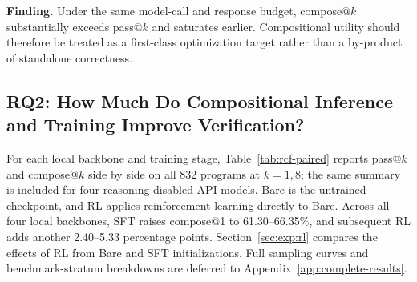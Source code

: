 \begin{insightbox}
\textbf{Finding.}
Under the same model-call and response budget, compose@\(k\) substantially
exceeds pass@\(k\) and saturates earlier.  Compositional utility should
therefore be treated as a first-class optimization target rather than a
by-product of standalone correctness.
\end{insightbox}

\subsection{RQ2: How Much Do Compositional Inference and Training Improve Verification?}
\label{sec:exp:main}

For each local backbone and training stage, Table~\ref{tab:rcf-paired}
reports pass@\(k\) and compose@\(k\) side by side on all 832 programs at
\(k{=}1,8\); the same summary is included for four reasoning-disabled API
models.  Bare is the untrained checkpoint, and RL applies reinforcement
learning directly to Bare.  Across all four local backbones, SFT raises
compose@1 to 61.30--66.35\%, and subsequent RL adds another 2.40--5.33
percentage points.  Section~\ref{sec:exp:rl} compares the effects of RL from
Bare and SFT initializations.  Full
sampling curves and benchmark-stratum breakdowns are deferred to
Appendix~\ref{app:complete-results}.

